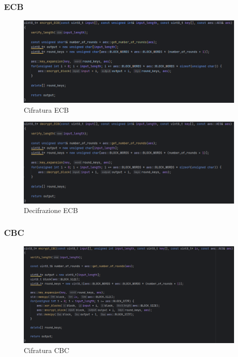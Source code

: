 
\subsubsection{ECB}

\begin{figure}[H]
	\centering
	\includegraphics[width=1\textwidth, height=1\textheight, keepaspectratio]{./images/code/cpp/modes/encrypt_ECB.PNG}
	\caption{Cifratura ECB}
	\label{fig:encrypt_ECB}
\end{figure}

\textsf{\small } %

\begin{figure}[H]
	\centering
	\includegraphics[width=1\textwidth, height=1\textheight, keepaspectratio]{./images/code/cpp/modes/decrypt_ECB.PNG}
	\caption{Decifrazione ECB}
	\label{fig:decrypt_ECB}
\end{figure}

\subsubsection{CBC}

\begin{figure}[H]
	\centering
	\includegraphics[width=1\textwidth, height=1\textheight, keepaspectratio]{./images/code/cpp/modes/encrypt_CBC.PNG}
	\caption{Cifratura CBC}
	\label{fig:encrypt_CBC}
\end{figure}

